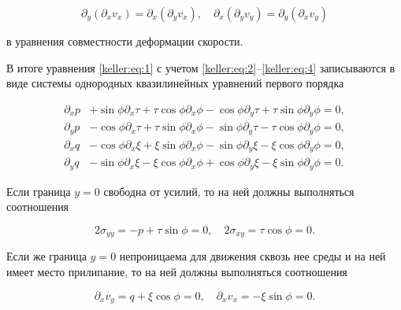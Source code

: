 $$\partial_y\left(\partial_x v_x\right) =\partial_x\left(\partial_y v_x\right),\quad \partial_x\left(\partial_y v_y\right) =\partial_y\left(\partial_x v_y\right)$$  

в уравнения совместности деформации скорости.

	

	В итоге уравнения \eqref{keller:eq:1} с учетом \eqref{keller:eq:2}--\eqref{keller:eq:4} записываются в виде системы однородных квазилинейных уравнений первого порядка

\begin{equation}\label{keller:eq:5}

\begin{split}

\partial_x p& +\sin\phi\partial_x\tau+\tau\cos\phi\partial_x\phi-\cos\phi\partial_y \tau+\tau\sin\phi\partial_y\phi=0,\\

\partial_y p& -\cos\phi\partial_x\tau+\tau\sin\phi\partial_x\phi-\sin\phi\partial_y \tau-\tau\cos\phi\partial_y\phi=0,\\

\partial_x q&-\cos\phi\partial_x\xi+\xi\sin\phi\partial_x\phi-\sin\phi\partial_y\xi-\xi\cos\phi\partial_y\phi=0,\\

\partial_y q&-\sin\phi\partial_x\xi-\xi\cos\phi\partial_x\phi+\cos\phi\partial_y\xi-\xi\sin\phi\partial_y\phi=0.

\end{split}

\end{equation}



Если граница $y=0$ свободна от усилий, то на ней должны выполняться соотношения

\begin{equation}\label{keller:eq:6}

	2\sigma_{yy}=-p+\tau\sin\phi=0,\quad 2\sigma_{xy}=\tau\cos\phi=0.

\end{equation}

Если же граница $y=0$ непроницаема для движения сквозь нее среды и на ней имеет место прилипание, то на ней должны выполняться соотношения 

\begin{equation}\label{keller:eq:7}

	\partial_x v_y =q+\xi\cos\phi=0,\quad \partial_x v_x=-\xi\sin\phi=0.

\end{equation}



